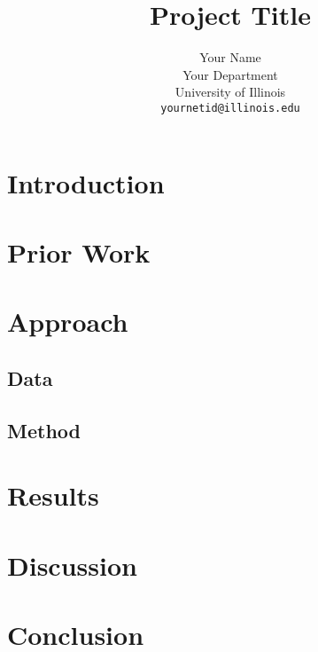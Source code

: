 \documentclass[11pt,a4paper]{article}
\title{Project Title}
\author{Your Name \\
  Your Department \\
  University of Illinois \\
  \texttt{yournetid@illinois.edu}}
\date{}
\begin{document}
\maketitle
\begin{abstract}
\lipsum[1] %
\end{abstract}

\section{Introduction}

\lipsum[2-5] \lipsum[66] %


\section{Prior Work}

\lipsum[6-20] \lipsum[17]  %


\section{Approach}

\lipsum[21]

\subsection{Data}
\lipsum[22-24]

\subsection{Method}
\lipsum[25-28]


\section{Results}

\lipsum[29-42] \lipsum[66]


\section{Discussion}

\lipsum[43-46]


\section{Conclusion}

\lipsum[47-49]

\nocite{Europarl} %



\end{document}
